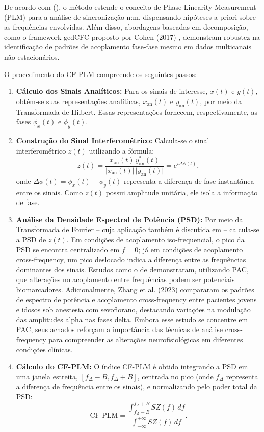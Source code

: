 De acordo com \citeauthor{sorrentino2022detection} (\citeyear{sorrentino2022detection}), o método estende o conceito de Phase Linearity Measurement (PLM) para a análise de sincronização n:m, dispensando hipóteses a priori sobre as frequências envolvidas. Além disso, abordagens baseadas em decomposição, como o framework gedCFC proposto por Cohen (2017) \cite{cohen2017multivariate}, demonstram robustez na identificação de padrões de acoplamento fase-fase mesmo em dados multicanais não estacionários.

O procedimento do CF-PLM compreende os seguintes passos:

\begin{enumerate}
    \item \textbf{Cálculo dos Sinais Analíticos:} Para os sinais de interesse, \(x(t)\) e \(y(t)\), obtém-se suas representações analíticas, \(x_{\mathrm{an}}(t)\) e \(y_{\mathrm{an}}(t)\), por meio da Transformada de Hilbert. Essas representações fornecem, respectivamente, as fases \(\phi_x(t)\) e \(\phi_y(t)\).
    \item \textbf{Construção do Sinal Interferométrico:} Calcula-se o sinal interferométrico \(z(t)\) utilizando a fórmula:
    \[
    z(t) = \frac{x_{\mathrm{an}}(t)\, y_{\mathrm{an}}^*(t)}{\lvert x_{\mathrm{an}}(t)\rvert\, \lvert y_{\mathrm{an}}(t)\rvert} = e^{i\Delta \phi(t)},
    \]
    onde \(\Delta \phi(t) = \phi_x(t) - \phi_y(t)\) representa a diferença de fase instantânea entre os sinais. Como \(z(t)\) possui amplitude unitária, ele isola a informação de fase.
    \item \textbf{Análise da Densidade Espectral de Potência (PSD):} Por meio da Transformada de Fourier -- cuja aplicação também é discutida em \cite{seraj2018} -- calcula-se a PSD de \( z(t) \). Em condições de acoplamento iso-frequencial, o pico da PSD se encontra centralizado em \(f = 0\); já em condições de acoplamento cross-frequency, um pico deslocado indica a diferença entre as frequências dominantes dos sinais. Estudos como o de \cite{chen2023multiple} demonstraram, utilizando PAC, que alterações no acoplamento entre frequências podem ser potenciais biomarcadores. Adicionalmente, Zhang et al. (2023) \cite{zhang2023differences} compararam os padrões de espectro de potência e acoplamento cross-frequency entre pacientes jovens e idosos sob anestesia com sevoflorano, destacando variações na modulação das amplitudes alpha nas fases delta. Embora esse estudo se concentre em PAC, seus achados reforçam a importância das técnicas de análise cross-frequency para compreender as alterações neurofisiológicas em diferentes condições clínicas.
    \item \textbf{Cálculo do CF-PLM:} O índice CF-PLM é obtido integrando a PSD em uma janela estreita, \([f_\Delta - B, f_\Delta + B]\), centrada no pico (onde \(f_\Delta\) representa a diferença de frequência entre os sinais), e normalizando pelo poder total da PSD:
    \[
    \text{CF-PLM} = \frac{\displaystyle\int_{f_\Delta - B}^{f_\Delta + B} SZ(f) \, df}{\displaystyle\int_{-\infty}^{+\infty} SZ(f) \, df}.
    \]
\end{enumerate}

